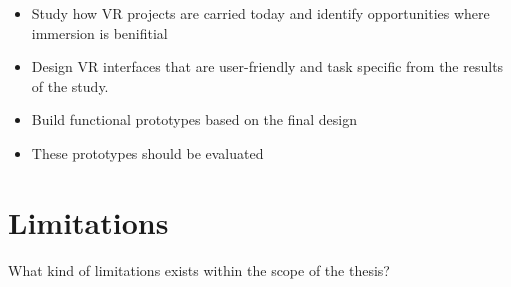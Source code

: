 \begin{itemize}
	\item Study how VR projects are carried today and identify opportunities where immersion is benifitial
	\item Design VR interfaces that are user-friendly and task specific from the results of the study.
	\item Build functional prototypes based on the final design
	\item These prototypes should be evaluated
\end{itemize}

\section{Limitations}
What kind of limitations exists within the scope of the thesis?
